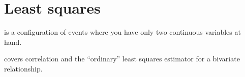 \chapter{Least squares}
\label{ch:ols}

 is a configuration of events where you have only two continuous variables at hand.%

	 covers correlation and the ``ordinary'' least squares estimator for a bivariate relationship.

%
%
%
%
%
%


% 
% 
% 
% 
% 
% 
% 
% 
